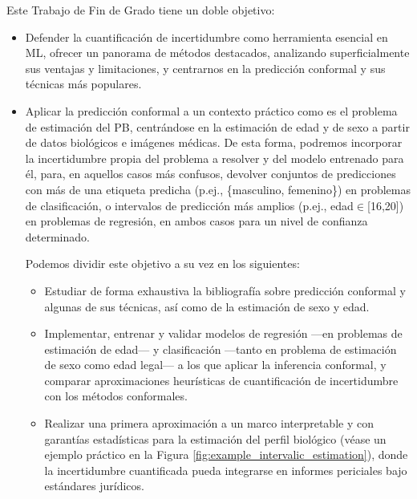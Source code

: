 Este Trabajo de Fin de Grado tiene un doble objetivo: 

\begin{itemize}

    \item Defender la cuantificación de incertidumbre como herramienta esencial en \acrshort{ML}, ofrecer un panorama de métodos destacados, analizando superficialmente sus ventajas y limitaciones, y centrarnos en la predicción conformal y sus técnicas más populares.

    \item Aplicar la predicción conformal a un contexto práctico como es el problema de estimación del \acrshort{PB}, centrándose en la estimación de edad y de sexo a partir de datos biológicos e imágenes médicas. De esta forma, podremos incorporar la incertidumbre propia del problema a resolver y del modelo entrenado para él, para, en aquellos casos más confusos, devolver conjuntos de predicciones con más de una etiqueta predicha (p.ej., \{masculino, femenino\}) en problemas de clasificación, o intervalos de predicción más amplios (p.ej., edad$\in$[16,20]) en problemas de regresión, en ambos casos para un nivel de confianza determinado.
    
    Podemos dividir este objetivo a su vez en los siguientes:

    \begin{itemize}

        \item Estudiar de forma exhaustiva la bibliografía sobre predicción conformal y algunas de sus técnicas, así como de la estimación de sexo y edad.

        \item Implementar, entrenar y validar modelos de regresión ---en problemas de estimación de edad--- y clasificación ---tanto en problema de estimación de sexo como edad legal--- a los que aplicar la inferencia conformal, y comparar aproximaciones heurísticas de cuantificación de incertidumbre con los métodos conformales.

        \item Realizar una primera aproximación a un marco interpretable y con garantías estadísticas para la estimación del perfil biológico (véase un ejemplo práctico en la Figura \ref{fig:example_intervalic_estimation}), donde la incertidumbre cuantificada pueda integrarse en informes periciales bajo estándares jurídicos.

    \end{itemize}

\end{itemize}

